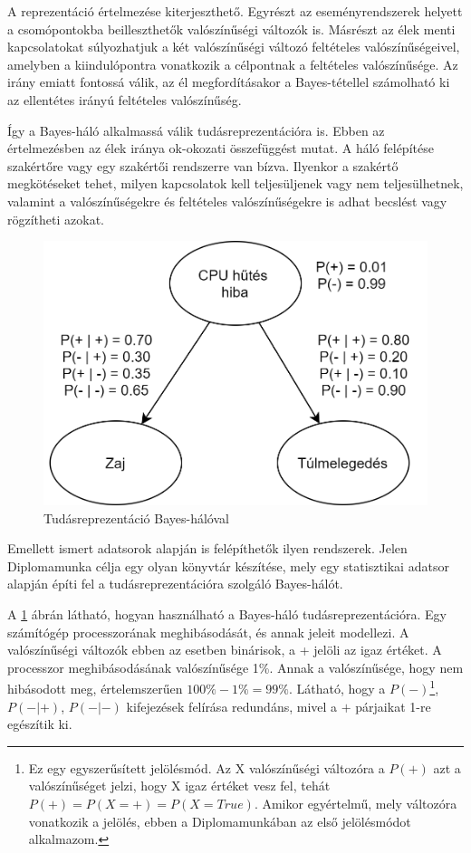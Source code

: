 A reprezentáció értelmezése kiterjeszthető. Egyrészt az eseményrendszerek helyett a csomópontokba beilleszthetők valószínűségi változók is. Másrészt az élek menti kapcsolatokat súlyozhatjuk a két valószínűségi változó feltételes valószínűségeivel, amelyben a kiindulópontra vonatkozik a célpontnak a feltételes valószínűsége. Az irány emiatt fontossá válik, az él megfordításakor a Bayes-tétellel számolható ki az ellentétes irányú feltételes valószínűség.

Így a Bayes-háló alkalmassá válik tudásreprezentációra is. Ebben az értelmezésben az élek iránya ok-okozati összefüggést mutat. A háló felépítése szakértőre vagy egy szakértői rendszerre van bízva. Ilyenkor a szakértő megkötéseket tehet, milyen kapcsolatok kell teljesüljenek vagy nem teljesülhetnek, valamint a valószínűségekre és feltételes valószínűségekre is adhat becslést vagy rögzítheti azokat.

\begin{figure}[htp]
    \centering
    \includegraphics[width=12cm]{figures/BayesianNetwork.png}
    \caption{Tudásreprezentáció Bayes-hálóval}
    \label{fig:bayes-halo-tudasrep}
\end{figure}

Emellett ismert adatsorok alapján is felépíthetők ilyen rendszerek. Jelen Diplomamunka célja egy olyan könyvtár készítése, mely egy statisztikai adatsor alapján építi fel a tudásreprezentációra szolgáló Bayes-hálót.

A \ref{fig:bayes-halo-tudasrep} ábrán látható, hogyan használható a Bayes-háló tudásreprezentációra. Egy számítógép processzorának meghibásodását, és annak jeleit modellezi. A valószínűségi változók ebben az esetben binárisok, a + jelöli az igaz értéket. A processzor meghibásodásának valószínűsége 1\%. Annak a valószínűsége, hogy nem hibásodott meg, értelemszerűen $100\%-1\%=99\%$. Látható, hogy a $P(-)$\footnote{Ez egy egyszerűsített jelölésmód. Az X valószínűségi változóra a $P(+)$ azt a valószínűséget jelzi, hogy X igaz értéket vesz fel, tehát $P(+) = P(X=+) = P(X=True)$. Amikor egyértelmű, mely változóra vonatkozik a jelölés, ebben a Diplomamunkában az első jelölésmódot alkalmazom.}, $P(-|+)$, $P(-|-)$ kifejezések felírása redundáns, mivel a $+$ párjaikat 1-re egészítik ki.

